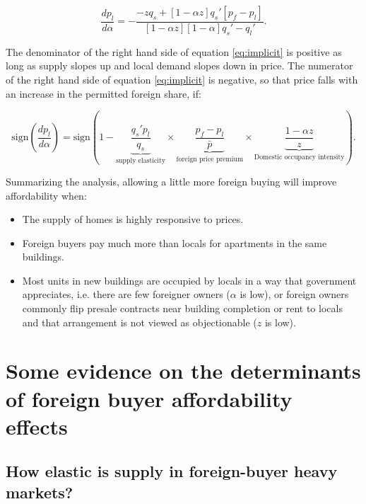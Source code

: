 \documentclass[12pt]{article}
\begin{document}
\begin{equation} 
	\label{eq:implicit} 
	\frac{dp_{l}}{d\alpha} = -\frac{-zq_{s} + \left[1-\alpha z\right]q_{s}'\left[p_{f}-p_{l}\right]}{\left[1-\alpha
z\right]\left[1-\alpha\right]q_{s}'-q_{l}'}.  
\end{equation}

The denominator of the right hand side of equation \eqref{eq:implicit} is positive as long as supply slopes up and local demand slopes down in price. The numerator of the right hand side of equation \eqref{eq:implicit} is negative, so that price falls with an increase in the permitted foreign share, if:

\begin{equation}
	\label{eq:sign}
	\text{sign}\left(\frac{dp_{l}}{d\alpha}\right) = \text{sign}\left(1-\underbrace{\frac{q_{s}'p_{l}}{q_{s}}}_{\text{supply elasticity}}\times\underbrace{\frac{p_{f}-p_{l}}{\bar{p}}}_{\text{foreign price premium}}\times\underbrace{\frac{1-\alpha z}{z}}_{\text{Domestic occupancy intensity}}\right).
\end{equation}

Summarizing the analysis, allowing a little more foreign buying will improve affordability when:

\begin{itemize}
	\item The supply of homes is highly responsive to prices.
	\item Foreign buyers pay much more than locals for apartments in the same buildings.
	\item Most units in new buildings are occupied by locals in a way that government appreciates, i.e. there are few foreigner owners ($\alpha$ is low), or foreign owners commonly flip presale contracts near building completion or rent to locals and that arrangement is not viewed as objectionable ($z$ is low).
\end{itemize}

\section{\label{sec:data} Some evidence on the determinants of foreign buyer affordability effects}

\subsection{How elastic is supply in foreign-buyer heavy markets?}
\end{document}
